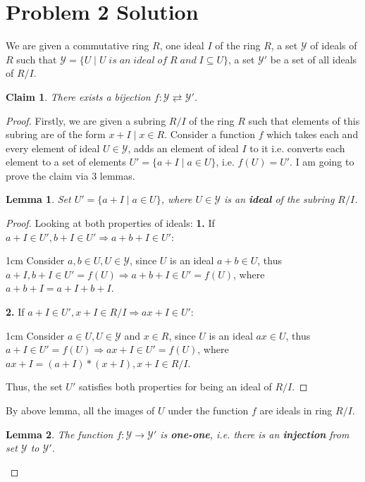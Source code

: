 \documentclass{article}
\let\bold\textbf
\newtheorem{lemma}{Lemma}[section]
\newtheorem{claim}{Claim}[subsection]
\newenvironment{myenv}{\begin{adjustwidth}{1cm}{}}{\end{adjustwidth}}
\begin{document}
\section{Problem 2 Solution}{
  We are given a commutative ring $R$, one ideal $I$ of the ring $R$, a set $\mathcal{Y}$ of ideals of $R$ such that $\mathcal{Y}=\{U \mid U \; is \; an \; ideal \; of \; R \; and \; I \subseteq U \}$, a set $\mathcal{Y}'$ be a set of all ideals of $R/I$.
  \begin{claim}
    There exists a bijection $f:\mathcal{Y}\rightleftarrows \mathcal{Y}'$.
  \end{claim}
  \begin{proof}
    Firstly, we are given a subring $R/I$ of the ring $R$ such that elements of this subring are of the form $x+I \mid x \in R$. \newline
    Consider a function $f$ which takes each and every element of ideal $U \in \mathcal{Y}$, adds an element of ideal $I$ to it i.e. converts each element to a set of elements $U'=\{a+I \mid a \in U\}$, i.e. $f(U)=U'$. \newline
    I am going to prove the claim via $3$ lemmas.
    \begin{lemma}
      Set $U'=\{a+I \mid a \in U\}$, where $U \in \mathcal{Y}$ is an \bold{ideal} of the subring $R/I$.
    \end{lemma}
    \begin{proof}
      Looking at both properties of ideals: \newline
      \bold{1.} If $a+I \in U',b+I \in U' \Rightarrow a+b+I \in U'$:
      \begin{myenv}
        Consider $a,b \in U, U \in \mathcal{Y}$, since $U$ is an ideal $a+b \in U$, thus $a+I,b+I \in U'=f(U) \Rightarrow a+b+I \in U'=f(U)$, where $a+b+I=a+I+b+I$.
      \end{myenv}
      \bold{2.} If $a+I \in U',x+I \in R/I \Rightarrow ax+I \in U'$:
      \begin{myenv}
        Consider $a \in U, U \in \mathcal{Y}$ and $x \in R$, since $U$ is an ideal $ax \in U$, thus $a+I \in U'=f(U) \Rightarrow ax+I \in U'=f(U)$, where $ax+I=(a+I)*(x+I),x+I \in R/I$.
      \end{myenv}
      Thus, the set $U'$ satisfies both properties for being an ideal of $R/I$.
    \end{proof}
    By above lemma, all the images of $U$ under the function $f$ are ideals in ring $R/I$.
    \begin{lemma}
      The function $f:\mathcal{Y} \rightarrow \mathcal{Y}'$ is \bold{one-one}, i.e. there is an \bold{injection} from set $\mathcal{Y}$ to $\mathcal{Y}'$.

\end{lemma}
\end{proof}}
\end{document}
